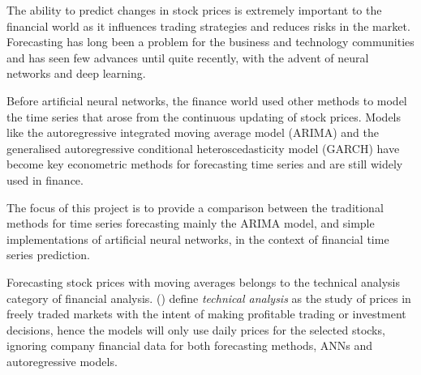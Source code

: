 The ability to predict changes in stock prices is extremely important to the financial world as it influences trading strategies and reduces risks in the market. Forecasting has long been a problem for the business and technology communities and has seen few advances until quite recently, with the advent of neural networks and deep learning.

Before artificial neural networks, the finance world used other methods to model the time series that arose from the continuous updating of stock prices. Models like the autoregressive integrated moving average model (ARIMA) and the generalised autoregressive conditional heteroscedasticity model (GARCH) have become key econometric methods for forecasting time series and are still widely used in finance.

The focus of this project is to provide a comparison between the traditional methods for time series forecasting mainly the ARIMA model, and simple implementations of artificial neural networks, in the context of financial time series prediction.

Forecasting stock prices with moving averages belongs to the technical analysis category of financial analysis. \citeauthor{tech_analysis} (\citeyear{tech_analysis}) define \textit{technical analysis} as the study of prices in freely traded markets with the intent of making profitable trading or investment decisions, hence the models will only use daily prices for the selected stocks, ignoring company financial data for both forecasting methods, ANNs and autoregressive models.

